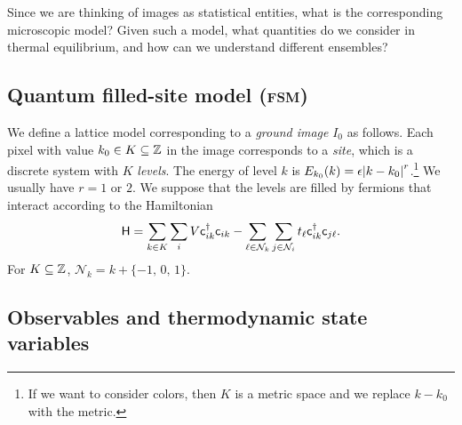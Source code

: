 \documentclass[../notebook.tex]{subfiles}
\begin{document}

Since we are thinking of images as statistical entities, what is the
corresponding microscopic model? Given such a model, what quantities do we
consider in thermal equilibrium, and how can we understand different ensembles?

\subsection{Quantum filled-site model (\textsc{fsm})}

\begin{defn}
  We define a lattice model corresponding to a \emph{ground image} $I_0$ as
  follows. Each pixel with value $k_0 \in K \subseteq \mathbb{Z}$ in the image
  corresponds to a \emph{site}, which is a discrete system with $K$
  \emph{levels}. The energy of level $k$ is $E_{k_0}(k) = \epsilon\abs{k -
    k_0}^r$.\footnote{If we want to consider colors, then $K$ is a metric space
  and we replace $k - k_0$ with the metric.}
  We usually have $r = 1$ or $2$. We suppose that the levels are filled by
  fermions that interact according to the Hamiltonian
  \[
    \mathsf{H}
    = \sum_{k \in K} \sum_i V\mathsf{c}_{ik}^\dag\mathsf{c}_{ik}
    - \sum_{\ell \in \mathcal{N}_k} \sum_{j \in \mathcal{N}_i}
    t_\ell \mathsf{c}_{ik}^\dag\mathsf{c}_{j\ell}.
  \]
  For $K \subseteq \mathbb{Z}$, $\mathcal{N}_k = k + \{-1,\, 0,\, 1\}$.
\end{defn}

\subsection{Observables and thermodynamic state variables}
\end{document}
